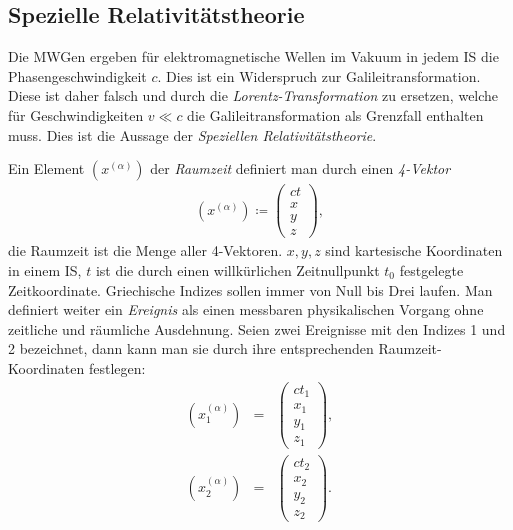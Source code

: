 \documentclass{book}
\begin{document}
\subsection{Spezielle Relativitätstheorie}
\label{sec:spezielle_relativitätstheorie}

Die MWGen ergeben für elektromagnetische Wellen im Vakuum in jedem IS die Phasengeschwindigkeit $c$. Dies ist ein Widerspruch zur Galileitransformation. Diese ist daher falsch und durch die \textit{Lorentz-Transformation} zu ersetzen, welche für Geschwindigkeiten $v\ll c$ die Galileitransformation als Grenzfall enthalten muss. Dies ist die Aussage der \textit{Speziellen Relativitätstheorie}.

Ein Element $\left(x^{\left(\alpha\right)}\right)$ der \textit{Raumzeit} definiert man durch einen \textit{4-Vektor}
%
\begin{eqnarray}
\left(x^{\left(\alpha\right)}\right) \coloneqq\left(\begin{array}{c}
ct\\
x\\
y\\
z
\end{array}\right), 
\end{eqnarray}
%
die Raumzeit ist die Menge aller 4-Vektoren. $x, y, z$ sind kartesische Koordinaten in einem IS, $t$ ist die durch einen willkürlichen Zeitnullpunkt $t_0$ festgelegte Zeitkoordinate. Griechische Indizes sollen immer von Null bis Drei laufen. Man definiert weiter ein \textit{Ereignis} als einen messbaren physikalischen Vorgang ohne zeitliche und räumliche Ausdehnung. Seien zwei Ereignisse mit den Indizes 1 und 2 bezeichnet, dann kann man sie durch ihre entsprechenden Raumzeit-Koordinaten festlegen:
%
\begin{eqnarray}
\left(x_1^{\left(\alpha\right)}\right) & = & \left(\begin{array}{c}
ct_1\\
x_1\\
y_1\\
z_1
\end{array}\right), \nonumber\\
\left(x_2^{\left(\alpha\right)}\right) & = & \left(\begin{array}{c}
ct_2\\
x_2\\
y_2\\
z_2
\end{array}\right).
\end{eqnarray}
\end{document}
